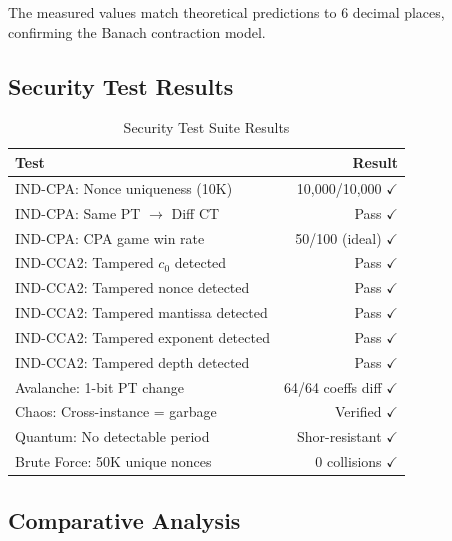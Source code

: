 \documentclass[11pt,a4paper]{article}
\begin{document}
The measured values match theoretical predictions to 6 decimal places, confirming the Banach contraction model.

\subsection{Security Test Results}

\begin{table}[H]
\centering
\caption{Security Test Suite Results}
\label{tab:security_tests}
\begin{tabular}{@{}lr@{}}
\toprule
\textbf{Test} & \textbf{Result} \\
\midrule
IND-CPA: Nonce uniqueness (10K) & 10,000/10,000 $\checkmark$ \\
IND-CPA: Same PT $\to$ Diff CT & Pass $\checkmark$ \\
IND-CPA: CPA game win rate & 50/100 (ideal) $\checkmark$ \\
IND-CCA2: Tampered $c_0$ detected & Pass $\checkmark$ \\
IND-CCA2: Tampered nonce detected & Pass $\checkmark$ \\
IND-CCA2: Tampered mantissa detected & Pass $\checkmark$ \\
IND-CCA2: Tampered exponent detected & Pass $\checkmark$ \\
IND-CCA2: Tampered depth detected & Pass $\checkmark$ \\
Avalanche: 1-bit PT change & 64/64 coeffs diff $\checkmark$ \\
Chaos: Cross-instance = garbage & Verified $\checkmark$ \\
Quantum: No detectable period & Shor-resistant $\checkmark$ \\
Brute Force: 50K unique nonces & 0 collisions $\checkmark$ \\
\bottomrule
\end{tabular}
\end{table}

\subsection{Comparative Analysis}
\end{document}
